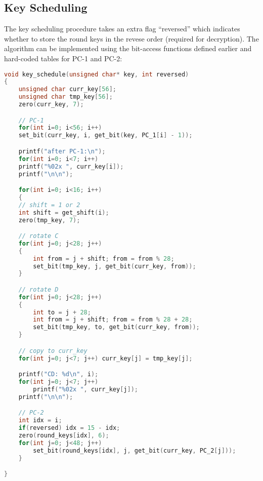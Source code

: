 \documentclass{article}
\begin{document}
\subsection{Key Scheduling}
The key scheduling procedure takes an extra flag ``reversed'' which indicates whether to store the round keys in the revese order (required for decryption). The algorithm can be implemented using the bit-access functions defined earlier and hard-coded tables for PC-1 and PC-2:
\begin{lstlisting}[language=c]
void key_schedule(unsigned char* key, int reversed)
{
    unsigned char curr_key[56];
    unsigned char tmp_key[56];
    zero(curr_key, 7);

    // PC-1
    for(int i=0; i<56; i++)
	set_bit(curr_key, i, get_bit(key, PC_1[i] - 1));

    printf("after PC-1:\n");
    for(int i=0; i<7; i++)
	printf("%02x ", curr_key[i]);
    printf("\n\n");

    for(int i=0; i<16; i++)
    {
	// shift = 1 or 2 
	int shift = get_shift(i);
	zero(tmp_key, 7);

	// rotate C
	for(int j=0; j<28; j++)
	{
	    int from = j + shift; from = from % 28;
	    set_bit(tmp_key, j, get_bit(curr_key, from));
	}

	// rotate D
	for(int j=0; j<28; j++)
	{
	    int to = j + 28;
	    int from = j + shift; from = from % 28 + 28;
	    set_bit(tmp_key, to, get_bit(curr_key, from));
	}

	// copy to curr_key
	for(int j=0; j<7; j++) curr_key[j] = tmp_key[j];

	printf("CD: %d\n", i);
	for(int j=0; j<7; j++)
	    printf("%02x ", curr_key[j]);
	printf("\n\n");

	// PC-2
	int idx = i;
	if(reversed) idx = 15 - idx;
	zero(round_keys[idx], 6);
	for(int j=0; j<48; j++)
	    set_bit(round_keys[idx], j, get_bit(curr_key, PC_2[j]));
    }

}
\end{lstlisting}
\end{document}
